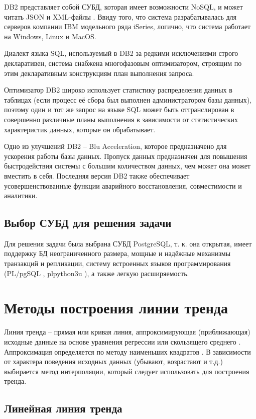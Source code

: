 \documentclass[a4paper,14pt]{extreport}
\begin{document}
DB2 представляет собой СУБД, которая имеет возможности NoSQL, и может читать JSON и XML-файлы  \cite{cmp_db}. Ввиду того, что система разрабатывалась для серверов компании IBM модельного ряда iSeries, логично, что система работает на Windows, Linux и MacOS.

Диалект языка SQL, используемый в DB2 за редкими исключениями строго декларативен, система снабжена многофазовым оптимизатором, строящим по этим декларативным конструкциям план выполнения запроса.

Оптимизатор DB2 широко использует статистику распределения данных в таблицах (если процесс её сбора был выполнен администратором базы данных), поэтому один и тот же запрос на языке SQL может быть оттранслирован в совершенно различные планы выполнения в зависимости от статистических характеристик данных, которые он обрабатывает.

Одно из улучшений DB2 -- Blu Acceleration, которое предназначено для ускорения работы базы данных. Пропуск данных предназначен для повышения быстродействия системы с большим количеством данных, чем может она может вместить в себя. Последняя версия DB2 также обеспечивает усовершенствованные функции аварийного восстановления, совместимости и аналитики.

\subsection{Выбор СУБД для решения задачи}

Для решения задачи была выбрана СУБД PostgreSQL, т. к. она открытая, имеет поддержку БД неограниченного размера, мощные и надёжные механизмы транзакций и репликации, систему встроенных языков программирования (PL/pgSQL \cite{plpgsql}, plpython3u \cite{plpython3u}), а также легкую расширяемость.

\section{Методы построения линии тренда}

Линия тренда -- прямая или кривая линия, аппроксимирующая (приближающая) исходные данные на основе уравнения регрессии или скользящего среднего \cite{lt_exel}. Аппроксимация определяется по ме­тоду наименьших квадратов \cite{mnk}. В зависимости от характера поведения исходных данных (убыва­ют, возрастают и т.д.) выбирается метод интерполяции, который сле­дует использовать для построения тренда.

\subsection{Линейная линия тренда}
\end{document}
